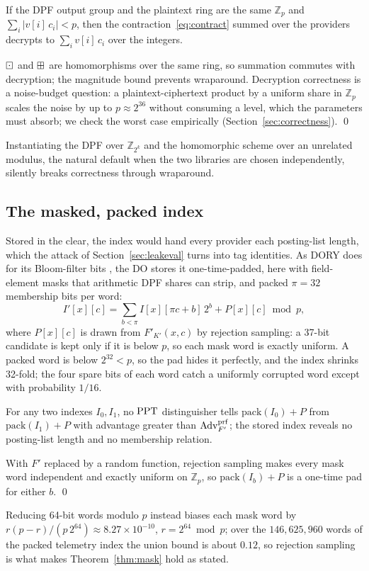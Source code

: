 \begin{lemma}
\label{lem:compat}
If the DPF output group and the plaintext ring are the same $\mathbb{Z}_p$ and
$\sum_i|v[i]\,c_i|<p$, then the contraction~\eqref{eq:contract} summed over the
providers decrypts to $\sum_i v[i]\,c_i$ over the integers.
\end{lemma}
\begin{pf}
$\boxdot$ and $\boxplus$ are homomorphisms over the same ring, so summation
commutes with decryption; the magnitude bound prevents wraparound. Decryption
correctness is a noise-budget question: a plaintext-ciphertext product by a
uniform share in $\mathbb{Z}_p$ scales the noise by up to $p\approx2^{36}$
without consuming a level, which the parameters must absorb; we check the worst
case empirically (Section~\ref{sec:correctness}). \qed
\end{pf}
Instantiating the DPF over $\mathbb{Z}_{2^k}$ and the homomorphic scheme over
an unrelated modulus, the natural default when the two libraries are chosen
independently, silently breaks correctness through wraparound.

\subsection{The masked, packed index}
\label{sec:mask}
Stored in the clear, the index would hand every provider each posting-list
length, which the attack of Section~\ref{sec:leakeval} turns into tag
identities. As DORY does for its Bloom-filter bits \citep{dory}, the DO stores
it one-time-padded, here with field-element masks that arithmetic DPF shares
can strip, and packed $\pi=32$ membership bits per word:
\begin{equation}
\label{eq:mask}
I'[x][c]=\textstyle\sum_{b<\pi}I[x][\pi c+b]\,2^b+P[x][c]\bmod p ,
\end{equation}
where $P[x][c]$ is drawn from $F'_{K'}(x,c)$ by rejection sampling: a 37-bit
candidate is kept only if it is below $p$, so each mask word is exactly
uniform. A packed word is below $2^{32}<p$, so the pad hides it perfectly, and
the index shrinks 32-fold; the four spare bits of each word catch a uniformly
corrupted word except with probability $1/16$.

\begin{theorem}
\label{thm:mask}
For any two indexes $I_0,I_1$, no $\mathrm{PPT}$ distinguisher tells
$\mathrm{pack}(I_0)+P$ from $\mathrm{pack}(I_1)+P$ with advantage greater than
$\mathrm{Adv}^{\mathrm{prf}}_{F'}$; the stored index reveals no posting-list length and no
membership relation.
\end{theorem}
\begin{pf}
With $F'$ replaced by a random function, rejection sampling makes every mask
word independent and exactly uniform on $\mathbb{Z}_p$, so
$\mathrm{pack}(I_b)+P$ is a one-time pad for either $b$. \qed
\end{pf}
Reducing 64-bit words modulo $p$ instead biases each mask word by
$r(p-r)/(p\,2^{64})\approx8.27\times10^{-10}$, $r=2^{64}\bmod p$; over the
$146{,}625{,}960$ words of the packed telemetry index the union bound is about
$0.12$, so rejection sampling is what makes Theorem~\ref{thm:mask} hold as
stated.


